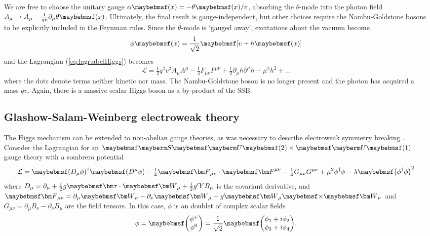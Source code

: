 We are free to choose the unitary gauge $\alpha\parenths{x} = -\theta\parenths{x}/v$,
absorbing the $\theta$-mode into the photon field 
$A_{\mu} \rightarrow A_{\mu} - \tfrac{1}{qv}\partial_{\mu} \theta\parenths{x}$. 
Ultimately, the final result is gauge-independent, but other choices require the 
Nambu-Goldstone bosons to be explicitly included in the Feynman rules. Since the 
$\theta$-mode is `gauged away', excitations about the vacuum become
\begin{equation}
	\phi\parenths{x} = \frac{1}{\sqrt{2}} \sqbracs{v + h\parenths{x}}
\end{equation}
and the Lagrangian (\ref{eq:lagr:abelHiggs}) becomes
\begin{equation}
	\mathcal{L}
	= \tfrac{1}{2} q^2 v^2 A_{\mu} A^{\mu}
	- \tfrac{1}{4} F_{\mu\nu}F^{\mu\nu}
	+ \tfrac{1}{2} \partial_{\mu}h \partial^{\mu}h
	- \mu^2 h^2
	+ \dots
\end{equation}
where the dots denote terms neither kinetic nor mass. 
The Nambu-Goldstone boson is no longer present and the photon has acquired a mass $qv$.
Again, there is a massive scalar Higgs boson as a by-product of the SSB.



\subsection{Glashow-Salam-Weinberg electroweak theory}

The Higgs mechanism can be extended to non-abelian gauge theories, as was necessary to 
describe electroweak symmetry breaking \cite{Kibble:1967,Weinberg:1967,Salam:1968}.
Consider the Lagrangian for an $\SUgroup{2}\times\Ugroup{1}$ gauge theory with a sombrero
potential
\begin{equation}
	\mathcal{L} 
	= \parenths{D_{\mu}\phi}^{\dagger} \parenths{D^{\mu}\phi}
	- \tfrac{1}{4} \bvec{F}_{\mu\nu} \cdot \bvec{F}^{\mu\nu}
	- \tfrac{1}{4} G_{\mu\nu} G^{\mu\nu}
	+ \mu^2 \phi^{\dagger} \phi - \lambda \parenths{\phi^{\dagger} \phi}^2
	\label{eq:lagr:ewHiggs}
\end{equation}
where $D_{\mu} = \partial_{\mu} + \tfrac{i}{2} g \bvec{\tau} \cdot \bvec{W}_{\mu} + 
\tfrac{i}{2} g' Y B_{\mu}$ is the covariant derivative, and $\bvec{F}_{\mu\nu} = 
\partial_{\mu}\bvec{W}_{\nu} - \partial_{\nu}\bvec{W}_{\mu} - g \bvec{W}_{\mu} \cross 
\bvec{W}_{\nu}$ and $G_{\mu\nu} = \partial_{\mu}B_{\nu} - \partial_{\nu}B_{\mu}$ are the
field tensors. In this case, $\phi$ is an  doublet of complex scalar fields
\begin{equation}
	\phi = \colvector{\phi^+\\\phi^0} = \frac{1}{\sqrt{2}} \colvector{ \phi_1 + i\phi_2\\ \phi_3 + i\phi_4}.
\end{equation}

